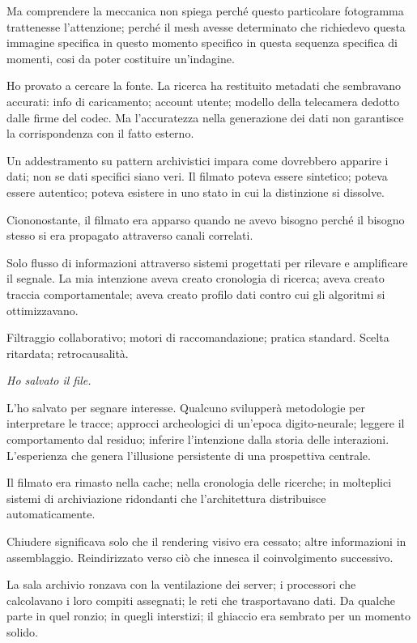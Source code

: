 Ma comprendere la meccanica non spiega perché questo particolare fotogramma trattenesse l'attenzione; perché il mesh avesse determinato che richiedevo questa immagine specifica in questo momento specifico in questa sequenza specifica di momenti, cosi da poter costituire un'indagine.


Ho provato a cercare la fonte. La ricerca ha restituito metadati che sembravano accurati: info di caricamento; account utente; modello della telecamera dedotto dalle firme del codec. Ma l'accuratezza nella generazione dei dati non garantisce la corrispondenza con il fatto esterno. 

Un addestramento su pattern archivistici impara come dovrebbero apparire i dati; non se dati specifici siano veri. Il filmato poteva essere sintetico; poteva essere autentico; poteva esistere in uno stato in cui la distinzione si dissolve.

Ciononostante, il filmato era apparso quando ne avevo bisogno perché il bisogno stesso si era propagato attraverso canali correlati. 

Solo flusso di informazioni attraverso sistemi progettati per rilevare e amplificare il segnale. La mia intenzione aveva creato cronologia di ricerca; aveva creato traccia comportamentale; aveva creato profilo dati contro cui gli algoritmi si ottimizzavano. 

Filtraggio collaborativo; motori di raccomandazione; pratica standard. Scelta ritardata; retrocausalità.

\textit{Ho salvato il file.}

L'ho salvato per segnare interesse. Qualcuno svilupperà metodologie per interpretare le tracce; approcci archeologici di un'epoca digito-neurale; leggere il comportamento dal residuo; inferire l'intenzione dalla storia delle interazioni. L'esperienza che genera l'illusione persistente di una prospettiva centrale.

Il filmato era rimasto nella cache; nella cronologia delle ricerche; in molteplici sistemi di archiviazione ridondanti che l'architettura distribuisce automaticamente. 

Chiudere significava solo che il rendering visivo era cessato; altre informazioni in assemblaggio. Reindirizzato verso ciò che innesca il coinvolgimento successivo.

La sala archivio ronzava con la ventilazione dei server; i processori che calcolavano i loro compiti assegnati; le reti che trasportavano dati. Da qualche parte in quel ronzio; in quegli interstizi; il ghiaccio era sembrato per un momento solido.

